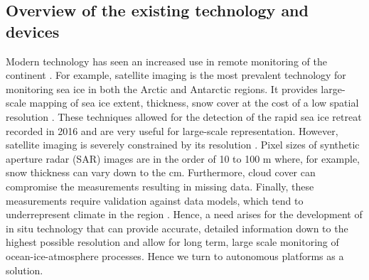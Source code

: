 
\subsection{Overview of the existing technology and devices}

Modern technology has seen an increased use in remote monitoring of the continent \cite{kennicutt2016delivering}. For example, satellite imaging is the most prevalent technology for monitoring sea ice in both the Arctic and Antarctic regions. It provides large-scale mapping of sea ice extent, thickness, snow cover at  the cost of a low spatial resolution \cite{turner2017unprecedented,galin2011validation,alberello2019drift}. These techniques allowed for the detection of the rapid sea ice retreat recorded in 2016 \cite{turner2017unprecedented} and are very useful for large-scale representation. However, satellite imaging is severely constrained by its resolution \cite{emery1997satellite}. Pixel sizes of synthetic aperture radar (SAR) images are in the order of 10 to 100 m \cite{galin2011validation} where, for example, snow thickness can vary down to the cm. Furthermore, cloud cover can compromise the measurements resulting in missing data. Finally, these measurements require validation against data models, which tend to underrepresent climate in the region \cite{galin2011validation,emery1997satellite}. Hence, a need arises for the development of in situ technology that can provide accurate, detailed information down to the highest possible resolution and allow for long term, large scale monitoring of ocean-ice-atmosphere processes. Hence we turn to autonomous platforms as a solution.\par 
